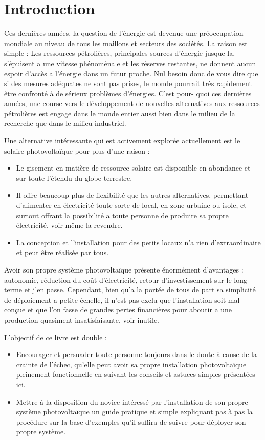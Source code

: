

\chapter*{Introduction}
Ces dernières années, la question de l’énergie est devenue une préoccupation mondiale au niveau de tous les maillons et secteurs des sociétés. La raison est simple : Les ressources pétrolières, principales sources d’énergie jusque la, s’épuisent a une vitesse phénoménale et les réserves restantes, ne donnent aucun espoir d’accès a l’énergie dans un futur proche. Nul besoin donc de vous dire que si des mesures adéquates ne sont pas prises, le monde pourrait très rapidement être confronté à de sérieux problèmes d’énergies. C’est pour- quoi ces dernières années, une course vers le développement de nouvelles alternatives aux ressources pétrolières est engage dans le monde entier aussi bien dans le milieu de la recherche que dans le milieu industriel.


Une alternative intéressante qui est activement explorée actuellement est le solaire photovoltaïque pour plus d’une raison :

\begin{itemize}
\item Le gisement en matière de ressource solaire est disponible en abondance et sur toute l’étendu du  globe terrestre.
\item	Il offre beaucoup plus de flexibilité que les autres alternatives, permettant d’alimenter en électricité toute sorte de local, en zone urbaine ou isole, et surtout offrant la possibilité a toute personne de produire sa propre électricité, voir même la revendre.
\item	La conception et l’installation pour des petits locaux n’a rien d’extraordinaire et peut être réalisée par tous.
\end{itemize}
Avoir son propre système photovoltaïque présente énormément d’avantages : autonomie, réduction du coût d’électricité, retour d’investissement sur le long terme et j’en passe. Cependant, bien qu’a la portée de tous de part sa simplicité de déploiement a petite échelle, il n’est pas exclu que l’installation soit mal conçue et que l’on fasse de grandes pertes financières pour aboutir a une production quasiment insatisfaisante, voir inutile.


L’objectif de ce livre est double :

\begin{itemize}
 \item Encourager et persuader toute personne toujours dans le doute à cause de la crainte de l’échec, qu’elle peut avoir sa propre installation photovoltaïque pleinement fonctionnelle en suivant les conseils et astuces simples présentées ici.
 \item Mettre à la disposition du novice intéressé par l’installation de son propre système photovoltaïque un guide pratique et simple expliquant pas à pas la procédure sur la base d’exemples qu’il suffira de suivre pour déployer son propre système.
\end{itemize}

